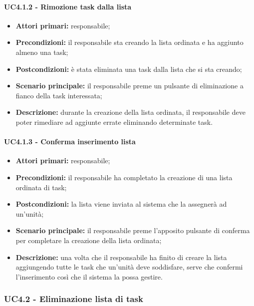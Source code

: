 \paragraph{UC4.1.2 - Rimozione task dalla lista}
\begin{itemize}
	\item 	\textbf{Attori primari:} responsabile;
	\item 	\textbf{Precondizioni:} il responsabile sta creando la lista ordinata e ha aggiunto almeno una task;
	\item 	\textbf{Postcondizioni:} è stata eliminata una task dalla lista che si sta creando;
	\item 	\textbf{Scenario principale:} il responsabile preme un pulsante di eliminazione a fianco della task interessata;
	\item 	\textbf{Descrizione:} durante la creazione della lista ordinata, il responsabile deve poter rimediare ad aggiunte errate eliminando determinate task.
\end{itemize}
\paragraph{UC4.1.3 - Conferma inserimento lista}
\begin{itemize}
	\item 	\textbf{Attori primari:} responsabile;
	\item 	\textbf{Precondizioni:} il responsabile ha completato la creazione di una lista ordinata di task;
	\item 	\textbf{Postcondizioni:} la lista viene inviata al sistema che la assegnerà ad un'unità;
	\item 	\textbf{Scenario principale:} il responsabile preme l'apposito pulsante di conferma per completare la creazione della lista ordinata;
	\item 	\textbf{Descrizione:} una volta che il responsabile ha finito di creare la lista aggiungendo tutte le task che un'unità deve soddisfare, serve che confermi l'inserimento così che il sistema la possa gestire.
	
\end{itemize}


\subsubsection{UC4.2 - Eliminazione lista di task}

